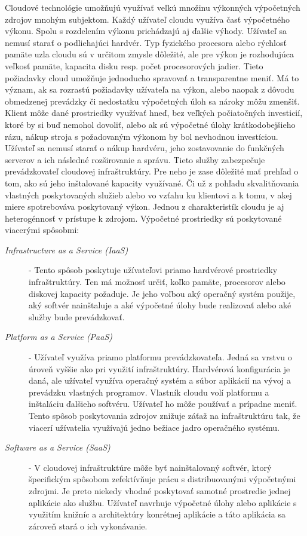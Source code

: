 \documentclass[11pt,final,oneside]{fithesis}
\begin{document}
Cloudové technológie umožňujú využívať veľkú množinu výkonných výpočetných zdrojov mnohým subjektom. Každý užívateľ cloudu využíva časť výpočetného výkonu. Spolu s rozdelením výkonu prichádzajú aj ďalšie výhody. Užívateľ sa nemusí starať
o podliehajúci hardvér. Typ fyzického procesora alebo rýchlosť pamäte uzla cloudu sú v určitom zmysle dôležité, ale pre výkon je rozhodujúca veľkosť pamäte, kapacita disku resp. počet procesorových jadier. Tieto požiadavky
cloud umožňuje jednoducho spravovať a transparentne meniť. Má to význam, ak sa rozrastú požiadavky užívateľa na výkon, alebo naopak z dôvodu obmedzenej prevádzky či 
nedostatku výpočetných úloh sa nároky môžu zmenšiť. Klient môže dané prostriedky využívať hneď, bez veľkých počiatočných investicií, ktoré by si buď nemohol dovoliť, alebo ak sú výpočetné úlohy krátkodobejšieho rázu, nákup
stroja s požadovaným výkonom by bol nevhodnou investíciou. Užívateľ sa nemusí starať o nákup hardvéru, jeho zostavovanie do funkčných serverov a ich následné rozširovanie a správu. Tieto služby zabezpečuje prevádzkovateľ cloudovej infraštruktúry.
Pre neho je zase dôležité mať prehľad o tom, ako sú jeho inštalované kapacity využívané. Či už z pohľadu skvalitňovania vlastných poskytovaných služieb alebo vo vzťahu ku klientovi a k tomu, v akej miere spotrebováva poskytovaný výkon.
Jednou z charakteristík cloudu je aj heterogénnosť v prístupe k zdrojom. Výpočetné prostriedky sú poskytované viacerými spôsobmi:

\begin{description}
\item[\emph{Infrastructure as a Service (IaaS)}] - Tento spôsob poskytuje užívateľovi priamo hardvérové prostriedky infraštruktúry. Ten má možnosť určiť, koľko pamäte, procesorov alebo diskovej kapacity požaduje. Je jeho voľbou
aký operačný systém použije, aký softvér nainštaluje a aké výpočetné úlohy bude realizovať alebo aké služby bude prevádzkovať.
\item[\emph{Platform as a Service (PaaS)}] - Užívateľ využíva priamo platformu prevádzkovateľa. Jedná sa vrstvu o úroveň vyššie ako pri využití infraštruktúry. Hardvérová konfigurácia je daná, ale užívateľ využíva operačný systém a 
súbor aplikácií na vývoj a prevádzku vlastných programov. Vlastník cloudu volí platformu a inštaláciu ďalšieho softvéru. Užívateľ ho môže používať a prípadne meniť. Tento spôsob poskytovania zdrojov znižuje záťaž na infraštruktúru
tak, že viacerí užívatelia využívajú jedno bežiace jadro operačného systému.
\item[\emph{Software as a Service (SaaS)}] - V cloudovej infraštruktúre môže byť nainštalovaný softvér, ktorý špecifickým spôsobom zefektívňuje prácu s distribuovanými výpočetnými zdrojmi. Je preto niekedy vhodné poskytovať samotné
prostredie jednej aplikácie ako službu. Užívateľ navrhuje výpočetné úlohy alebo aplikácie s využitím knižníc a architektúry konrétnej aplikácie a táto aplikácia sa zároveň stará o ich vykonávanie. 
\end{description}
\end{document}
